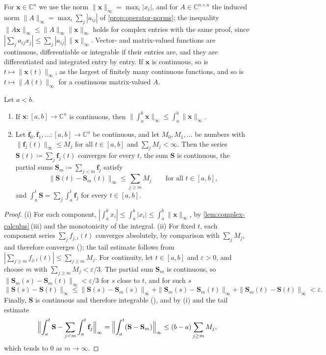 For $\mathbf x\in\mathbb C^n$ we use the norm $\|\mathbf x\|_\infty=\max_i|x_i|$, and for $A\in\mathbb C^{n\times n}$ the induced norm $\|A\|_\infty=\max_i\sum_j|a_{ij}|$ of \cref{prop:operator-norms}; the inequality $\|A\mathbf x\|_\infty\le\|A\|_\infty\|\mathbf x\|_\infty$ holds for complex entries with the same proof, since $|\sum_ja_{ij}x_j|\le\sum_j|a_{ij}|\,\|\mathbf x\|_\infty$. Vector- and matrix-valued functions are continuous, differentiable or integrable if their entries are, and they are differentiated and integrated entry by entry. If $\mathbf x$ is continuous, so is $t\mapsto\|\mathbf x(t)\|_\infty$, as the largest of finitely many continuous functions, and so is $t\mapsto\|A(t)\|_\infty$ for a continuous matrix-valued $A$.

\begin{lemma}
\label{lem:vector-functions}
Let $a<b$.
\begin{enumerate}
\item If $\mathbf x\colon[a,b]\to\mathbb C^n$ is continuous, then $\bigl\|\int_a^b\mathbf x\bigr\|_\infty\le\int_a^b\|\mathbf x\|_\infty$.
\item Let $\mathbf f_0,\mathbf f_1,\ldots\colon[a,b]\to\mathbb C^n$ be continuous, and let $M_0,M_1,\ldots$ be numbers with $\|\mathbf f_j(t)\|_\infty\le M_j$ for all $t\in[a,b]$ and $\sum_jM_j<\infty$. Then the series $\mathbf S(t)\coloneqq\sum_j\mathbf f_j(t)$ converges for every $t$, the sum $\mathbf S$ is continuous, the partial sums $\mathbf S_m\coloneqq\sum_{j<m}\mathbf f_j$ satisfy
\[
\|\mathbf S(t)-\mathbf S_m(t)\|_\infty\le\sum_{j\ge m}M_j\qquad\text{for all }t\in[a,b],
\]
and $\int_a^t\mathbf S=\sum_j\int_a^t\mathbf f_j$ for every $t\in[a,b]$.
\end{enumerate}
\end{lemma}

\begin{proof}
(i) For each component, $|\int_a^bx_i|\le\int_a^b|x_i|\le\int_a^b\|\mathbf x\|_\infty$, by \cref{lem:complex-calculus}\,(iii) and the monotonicity of the integral. (ii) For fixed $t$, each component series $\sum_jf_{j,i}(t)$ converges absolutely, by comparison with $\sum_jM_j$, and therefore converges (); the tail estimate follows from $|\sum_{j\ge m}f_{j,i}(t)|\le\sum_{j\ge m}M_j$. For continuity, let $t\in[a,b]$ and $\varepsilon>0$, and choose $m$ with $\sum_{j\ge m}M_j<\varepsilon/3$. The partial sum $\mathbf S_m$ is continuous, so $\|\mathbf S_m(s)-\mathbf S_m(t)\|_\infty<\varepsilon/3$ for $s$ close to $t$, and for such $s$
\[
\|\mathbf S(s)-\mathbf S(t)\|_\infty\le\|\mathbf S(s)-\mathbf S_m(s)\|_\infty+\|\mathbf S_m(s)-\mathbf S_m(t)\|_\infty+\|\mathbf S_m(t)-\mathbf S(t)\|_\infty<\varepsilon .
\]
Finally, $\mathbf S$ is continuous and therefore integrable (), and by (i) and the tail estimate
\[
\Bigl\|\int_a^t\mathbf S-\sum_{j<m}\int_a^t\mathbf f_j\Bigr\|_\infty=\Bigl\|\int_a^t(\mathbf S-\mathbf S_m)\Bigr\|_\infty\le(b-a)\sum_{j\ge m}M_j ,
\]
which tends to $0$ as $m\to\infty$.
\end{proof}

